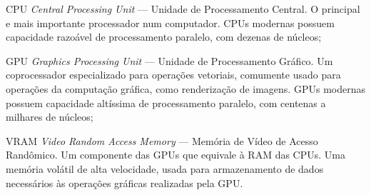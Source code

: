 \documentclass[12pt,
openright, 
oneside, %
a4paper,    %
brazil]{facom-ufu-abntex2}
\begin{document}


\listoffigures*
\cleardoublepage




\listoftables*
\cleardoublepage




\begin{siglas}
  \item[CPU] \textit{Central Processing Unit} --- Unidade de Processamento Central. O principal e mais importante processador num computador. CPUs modernas possuem capacidade razoável de processamento paralelo, com dezenas de núcleos;
  \item[GPU] \textit{Graphics Processing Unit} --- Unidade de Processamento Gráfico. Um coprocessador especializado para operações vetoriais, comumente usado para operações da computação gráfica, como renderização de imagens. GPUs modernas possuem capacidade altíssima de processamento paralelo, com centenas a milhares de núcleos;
  \item[VRAM] \textit{Video Random Access Memory} --- Memória de Vídeo de Acesso Randômico. Um componente das GPUs que equivale à RAM das CPUs. Uma memória volátil de alta velocidade, usada para armazenamento de dados necessários às operações gráficas realizadas pela GPU.
\end{siglas}




\end{document}
